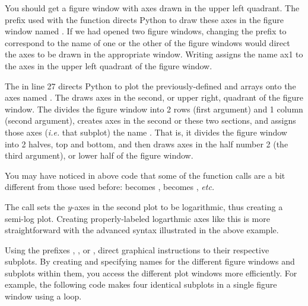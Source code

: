 \documentclass[letterpaper,10pt,english]{sphinxmanual}
\begin{document}
You should get a figure window with axes drawn in the upper left quadrant.  The  prefix used with the  function directs Python to draw these axes in the figure window named .  If we had opened two figure windows, changing the prefix to correspond to the name of one or the other of the figure windows would direct the axes to be drawn in the appropriate window.  Writing  assigns the name ax1 to the axes in the upper left quadrant of the figure window.

The  in line 27 directs Python to plot the previously-defined  and  arrays onto the axes named . The  draws axes in the second, or upper right, quadrant of the figure window. The  divides the figure window into 2 rows (first argument) and 1 column (second argument), creates axes in the second or these two sections, and assigns those axes (\emph{i.e.} that subplot) the name .  That is, it divides the figure window into 2 halves, top and bottom, and then draws axes in the half number 2 (the third argument), or lower half of the figure window.

You may have noticed in above code that some of the function calls are a bit different from those used before:  becomes ,  becomes , \emph{etc.}

The call  sets the $y$-axes in the second plot to be logarithmic, thus creating a semi-log plot.  Creating properly-labeled logarthmic axes like this is more straightforward with the advanced syntax illustrated in the above example.

Using the prefixes , , or , direct graphical instructions to their respective subplots.  By creating and specifying names for the different figure windows and subplots within them, you access the different plot windows more efficiently.  For example, the following code makes four identical subplots in a single figure window using a  loop.
\end{document}
